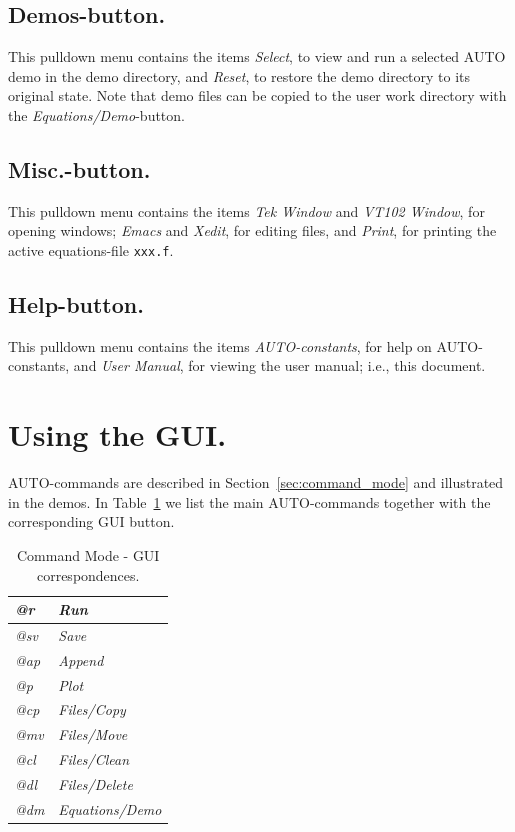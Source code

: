 \documentclass[12pt]{report}
\begin{document}
\subsection{ Demos-button.}
This pulldown menu contains the items
{\it Select},
to view and run a selected {\cal AUTO} demo in the demo directory,
and
{\it Reset},
to restore the demo directory to its original state.
Note that demo files can be copied to the user work directory
with the {\it Equations/Demo}-button.


\subsection{ Misc.-button.}
This pulldown menu contains the items
{\it Tek Window}
and
{\it VT102 Window},
for opening windows;
{\it Emacs}
and
{\it Xedit},
for editing files,
and
{\it Print}, for printing the active equations-file {\tt xxx.f}.


\subsection{ Help-button.}
This pulldown menu contains the items
{\it {\cal AUTO}-constants}, for help on {\cal AUTO}-constants,
and
{\it User Manual}, for viewing the user manual; i.e., this document.


\section{ Using the GUI.} \label{sec:Using_the_GUI}
{\cal AUTO}-commands are described in Section~\ref{sec:command_mode} and
illustrated in the demos.
In Table~\ref{tbl:CM_GUI} we list the main {\cal AUTO}-commands 
together with the corresponding GUI button.

\begin{table}[htbp]
\begin{center}
\begin{tabular}{| l | l |}
\hline
{\it @r }  & {\it Run} \\  
\hline
{\it @sv }  & {\it Save}  \\ 
\hline
{\it @ap }  & {\it Append} \\ 
\hline
{\it @p }  & {\it Plot}  \\ 
\hline
{\it @cp }  & {\it Files/Copy}  \\ 
\hline
{\it @mv }  & {\it Files/Move}  \\ 
\hline
{\it @cl }  & {\it Files/Clean} \\ 
\hline
{\it @dl }  & {\it Files/Delete} \\  
\hline
{\it @dm }  & {\it Equations/Demo} \\  
\hline
\end{tabular}
\caption{Command Mode - GUI correspondences.}
\label{tbl:CM_GUI}
\end{center}
\end{table}
\end{document}
